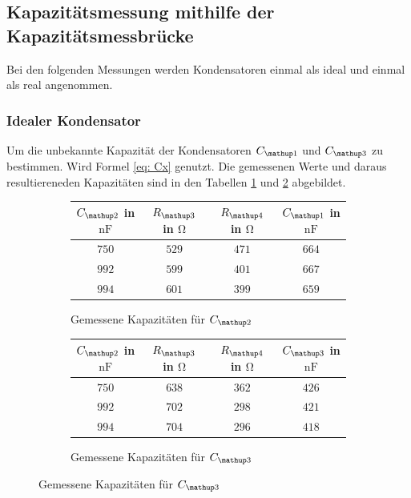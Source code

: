 \subsection{Kapazitätsmessung mithilfe der Kapazitätsmessbrücke}

Bei den folgenden Messungen werden
Kondensatoren einmal als ideal und einmal als real angenommen.

\subsubsection{Idealer Kondensator}

Um die unbekannte Kapazität der Kondensatoren $C\ua{1}$ und $C\ua{3}$
zu bestimmen. Wird Formel \eqref{eq: Cx} genutzt.
Die gemessenen Werte und daraus resultiereneden Kapazitäten sind in den %
Tabellen \ref{tab:kap_c1} und \ref{tab:kap_c3} abgebildet.

\begin{figure}
\begin{subfigure}{0.49\textwidth}
\centering
\hspace{-0.25cm}
\caption{Gemessene Kapazitäten für $C\ua{2}$}
  \label{tab:kap_c1}
\begin{tabular}{S S S S}
    \toprule
    {$C\ua{2}$ in $\si{\nano\farad}$} &  {$R\ua{3}$ in $\si{\ohm}$} & {$R\ua{4}$ in $\si{\ohm}$} & {$C\ua{1}$ in $\si{\nano\farad}$}  \\
    \midrule
     {$\num{750}$} & {$\num{529}$} &  {$\num{471}$}& {$\num{664}$}  \\
     {$\num{992}$} & {$\num{599}$}  & {$\num{401}$} & {$\num{667}$}  \\
     {$\num{994}$} & {$\num{601}$}  & {$\num{399}$} & {$\num{659}$}  \\
     \bottomrule
	\end{tabular}

\end{subfigure}
\hspace{0.5cm}
\begin{subfigure}{0.49\textwidth}
\centering
\caption{Gemessene Kapazitäten für $C\ua{3}$}
  \label{tab:kap_c3}
\begin{tabular}{S S S S}
      \toprule
    {$C\ua{2}$ in $\si{\nano\farad}$} &  {$R\ua{3}$ in $\si{\ohm}$} & {$R\ua{4}$ in $\si{\ohm}$} & {$C\ua{3}$ in $\si{\nano\farad}$}  \\
    \midrule
     {$\num{750}$} & {$\num{638}$}  & {$\num{362}$} & {$\num{426}$}  \\
     {$\num{992}$} & {$\num{702}$}  & {$\num{298}$} & {$\num{421}$}  \\
     {$\num{994}$} & {$\num{704}$} &  {$\num{296}$}& {$\num{418}$}  \\
     \bottomrule
  \end{tabular}
\end{subfigure}
\label{fig:tabellen_cx_3}
\end{figure}

